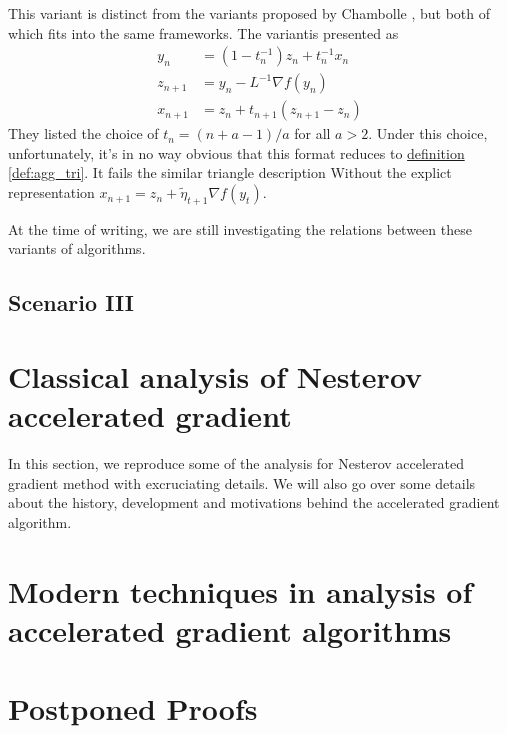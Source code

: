 \documentclass[12pt]{article}
\begin{document}
        \begin{remark}
            This variant is distinct from the variants proposed by Chambolle \cite{chambolle_convergence_2015}, but both of which fits into the same frameworks. 
            The variantis presented as 
            \begin{align*}
                y_n &= (1 - t_n^{-1})z_n + t_n^{-1} x_n
                \\
                z_{n + 1} &= y_n - L^{-1}\nabla f(y_n)
                \\
                x_{n + 1} &= z_n + t_{n + 1}(z_{n + 1} - z_n)
            \end{align*}
            They listed the choice of $t_n = (n + a - 1)/a$ for all $a > 2$. 
            Under this choice, unfortunately, it's in no way obvious that this format reduces to \hyperref[def:agg_tri]{definition \ref*{def:agg_tri}}. 
            It fails the similar triangle description Without the explict representation $x_{n + 1} = z_n + \tilde\eta_{t + 1}\nabla f(y_t)$. 
            \par\noindent
            At the time of writing, we are still investigating the relations between these variants of algorithms.
        \end{remark}
        
    \subsection{Scenario III}
    


\section{Classical analysis of Nesterov accelerated gradient}
    In this section, we reproduce some of the analysis for Nesterov accelerated gradient method with excruciating details. 
    We will also go over some details about the history, development and motivations behind the accelerated gradient algorithm. 

\section{Modern techniques in analysis of accelerated gradient algorithms}
    

\printbibliography

\appendix
\section*{Postponed Proofs}
    
\end{document}
